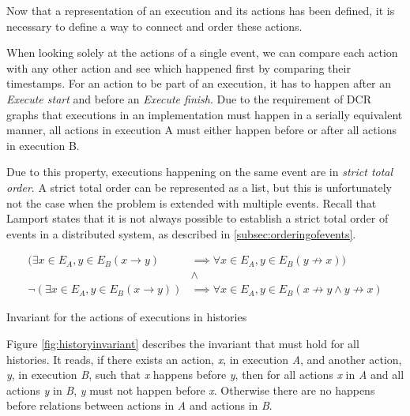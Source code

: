 	\newpar Now that a representation of an execution and its actions has been defined, it is necessary to define a way to connect and order these actions.
    
    \newpar When looking solely at the actions of a single event, we can compare each action with any other action and see which happened first by comparing their timestamps. For an action to be part of an execution, it has to happen after an \textit{Execute start} and before an \textit{Execute finish}. Due to the requirement of DCR graphs that executions in an implementation must happen in a serially equivalent manner, all actions in execution A must either happen before or after all actions in execution B.
    
	\newpar Due to this property, executions happening on the same event are in  \textit{strict total order}. A strict total order can be represented as a list, but this is unfortunately not the case when the problem is extended with multiple events. Recall that Lamport states that it is not always possible to establish a strict total order of events in a distributed system, as described in \autoref{subsec:orderingofevents}.
	
	\begin{invariant}
		\begin{align*}
			(\exists{x\in E_A, y\in E_B}(x\rightarrow y) &\implies \forall{x\in E_A, y\in E_B}(y\not\rightarrow x))\\
			&\land \\
			\lnot(\exists{x\in E_A, y\in E_B}(x \rightarrow y)) &\implies \forall{x\in E_A, y\in E_B}(x\not\rightarrow y\land y\not\rightarrow x)
		\end{align*}
		\caption{Invariant for the actions of executions in histories}
		\label{fig:historyinvariant}
	\end{invariant}
	
	\newpar
	Figure \ref{fig:historyinvariant} describes the invariant that must hold for all histories. It reads, if there exists an action, \textit{x}, in execution \textit{A}, and another action, \textit{y}, in execution \textit{B}, such that \textit{x} happens before \textit{y}, then for all actions \textit{x} in \textit{A} and all actions \textit{y} in \textit{B}, \textit{y} must not happen before \textit{x}. Otherwise there are no happens before relations between actions in \textit{A} and actions in \textit{B}.
	
    
